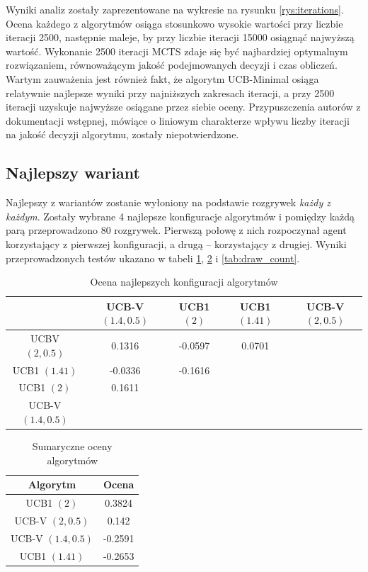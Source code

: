 \documentclass[a4paper,12pt]{article}
\begin{document}
Wyniki analiz zostały zaprezentowane na wykresie na rysunku \ref{rys:iterations}. Ocena każdego z algorytmów osiąga stosunkowo wysokie wartości przy liczbie iteracji 2500, następnie maleje, by przy liczbie iteracji 15000 osiągnąć najwyższą wartość. Wykonanie 2500 iteracji MCTS zdaje się być najbardziej optymalnym rozwiązaniem, równoważącym jakość podejmowanych decyzji i czas obliczeń. Wartym zauważenia jest również fakt, że algorytm UCB-Minimal osiąga relatywnie najlepsze wyniki przy najniższych zakresach iteracji, a przy 2500 iteracji uzyskuje najwyższe osiągane przez siebie oceny. Przypuszczenia autorów z dokumentacji wstępnej, mówiące o liniowym charakterze wpływu liczby iteracji na jakość decyzji algorytmu, zostały niepotwierdzone.

\clearpage

\subsection{Najlepszy wariant} \label{subs:variant}
Najlepszy z wariantów zostanie wyłoniony na podstawie rozgrywek \textit{każdy z każdym}. Zostały wybrane 4 najlepsze konfiguracje algorytmów i pomiędzy każdą parą przeprowadzono 80 rozgrywek. Pierwszą połowę z nich rozpoczynał agent korzystający z pierwszej konfiguracji, a drugą -- korzystający z drugiej. Wyniki przeprowadzonych testów ukazano w tabeli \ref{tab:best_variant}, \ref{tab:best_variant_sum} i \ref{tab:draw_count}.

\begin{table}[!h]
	\centering
	\begin{tabular}{|c|c|c|c|c|} \hline
		& UCB-V $(1.4, 0.5)$ & UCB1 $(2)$ & UCB1 $(1.41)$ & UCB-V $(2, 0.5)$ \\ \hline
		UCBV $(2, 0.5)$ & 0.1316 & -0.0597 & 0.0701 & \cellcolor{lightgray} \\ \hline
		UCB1 $(1.41)$ & -0.0336 & -0.1616 & \cellcolor{lightgray} & \cellcolor{lightgray} \\ \hline
		UCB1 $(2)$ & 0.1611 & \cellcolor{lightgray} & \cellcolor{lightgray} & \cellcolor{lightgray}  \\ \hline
		UCB-V $(1.4, 0.5)$ & \cellcolor{lightgray} & \cellcolor{lightgray} & \cellcolor{lightgray} & \cellcolor{lightgray} \\ \hline
	\end{tabular}
	\caption{Ocena najlepszych konfiguracji algorytmów}
	\label{tab:best_variant}
\end{table}

\begin{table}[!h]
\centering
\begin{tabular}{|c|c|} \hline
	Algorytm & Ocena \\ \hline
	UCB1 $(2)$ & 0.3824 \\ \hline
	UCB-V $(2, 0.5)$ & 0.142 \\ \hline
	UCB-V $(1.4, 0.5)$ &	 -0.2591 \\ \hline
	UCB1 $(1.41)$ &	-0.2653 \\ \hline
\end{tabular}
\caption{Sumaryczne oceny algorytmów}
\label{tab:best_variant_sum}
\end{table}
\end{document}
